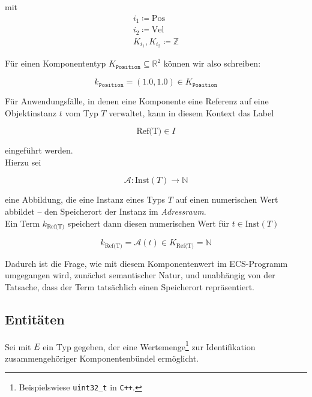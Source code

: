 \noindent
mit
\[
    \begin{align}
        i_1 \coloneqq \text{Pos}\\
        i_2 \coloneqq \text{Vel}\\
        K_{i_1}, K_{i_2} \coloneq \mathbb{Z}
    \end{align}
\]

\noindent
Für einen Komponententyp $K_\texttt{Position} \subseteq \mathbb{R}^2$ können wir also schreiben:

\[
    k_{\texttt{Position}} = (1.0, 1.0) \in K_\texttt{Position}
\]



\begin{tcolorbox}[title={Komponenten als Informationsträger für Referenzen}]
Für Anwendungsfälle, in denen eine Komponente eine Referenz auf eine Objektinstanz $t$ vom Typ $T$ verwaltet, kann in diesem Kontext das Label

\[
    \text{Ref(T)} \in I
\]

\noindent
eingeführt werden.\\

\noindent
Hierzu sei

\[
    \mathcal{A} \colon \text{Inst}(T) \rightarrow \mathbb{N}
\]

\noindent
eine Abbildung, die eine Instanz eines Typs $T$ auf einen numerischen Wert abbildet -- den Speicherort der Instanz im \textit{Adressraum}.\\

\noindent
Ein Term $k_{\text{Ref(T)}}$ speichert dann diesen numerischen Wert für $t \in \text{Inst}(T)$

\[
    k_{\text{Ref(T)}} = \mathcal{A}(t) \in K_{\text{Ref(T)}} = \mathbb{N}
\]


\noindent
Dadurch ist die Frage, wie mit diesem Komponentenwert im ECS-Programm umgegangen wird, zunächst semantischer Natur, und unabhängig von der Tatsache, dass der Term tatsächlich einen Speicherort repräsentiert.
\end{tcolorbox}

\subsection{Entitäten}

Sei mit $E$ ein Typ gegeben, der eine Wertemenge\footnote{
    Beispielswiese \texttt{uint32\_t} in \texttt{C++}.
} zur Identifikation zusammengehöriger Komponentenbündel ermöglicht.\\

